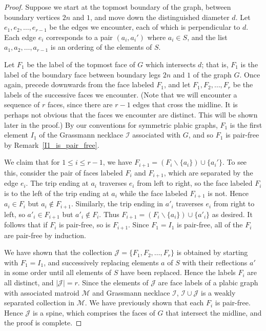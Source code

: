 \documentclass[10pt]{amsart}
\theoremstyle{definition}
\begin{document}
\begin{proof}
Suppose we start at the topmost boundary of the graph, between boundary vertices $2n$ and $1$, and move down the distinguished diameter $d$. Let $e_1, e_2, \ldots, e_{r-1}$ be the edges we encounter, each of which is perpendicular to $d$. Each edge $e_i$ corresponds to a pair $(a_i, a_i')$ where $a_i \in S$, and the list $a_1,a_2,\ldots,a_{r-1}$ is an ordering of the elements of $S$.

Let $F_1$ be the label of the topmost face of $G$ which intersects $d$; that is, $F_1$ is the label of the boundary face between boundary legs $2n$ and $1$ of the graph $G$. Once again, precede downwards from the face labeled $F_1$, and let $F_1, F_2, \ldots, F_r$ be the labels of the successive faces we encounter. (Note that we will encounter a sequence of $r$ faces, since there are $r-1$ edges that cross the midline. It is perhaps not obvious that the faces we encounter are distinct. This will be shown later in the proof.) By our conventions for symmetric plabic graphs, $F_1$ is the first element $I_1$ of the Grassmann necklace $\mathcal{I}$ associated with $G$, and so $F_1$ is pair-free by Remark~\ref{I1_is_pair_free}.

We claim that for $1 \leq i \leq r-1$, we have $F_{i+1} = (F_i \backslash \{a_i\}) \cup \{a_i'\}$. To see this, consider the pair of faces labeled $F_i$ and $F_{i+1}$, which are separated by the edge $e_i$. The trip ending at $a_i$ traverses $e_i$ from left to right, so the face labeled $F_{i}$ is to the left of the trip ending at $a_i$ while the face labeled $F_{i+1}$ is not. Hence $a_i \in F_{i}$ but $a_i \not\in F_{i+1}$. Similarly, the trip ending in $a'_i$ traverses $e_i$ from right to left, so $a'_i \in F_{i+1}$ but $a'_i \not\in F_{i}$. Thus $F_{i+1} = (F_i \backslash \{a_i\}) \cup \{a'_i\}$ as desired. It follows that if $F_i$ is pair-free, so is $F_{i+1}$. Since $F_1 = I_1$ is pair-free, all of the $F_i$ are pair-free by induction.

We have shown that the collection $\mathcal{J} = \{F_1, F_2, \ldots, F_r\}$ is obtained by starting with $F_1 = I_1$, and successively replacing elements $a$ of $S$ with their reflections $a'$ in some order until all elements of $S$ have been replaced. Hence the labels $F_i$ are all distinct, and $|\mathcal{J}| = r$. Since the elements of $\mathcal{J}$ are face labels of a plabic graph with associated matroid $\mathcal{M}$ and Grassmann necklace $\mathcal{I}$, $\mathcal{I} \cup \mathcal{J}$ is a weakly separated collection in $\mathcal{M}$. We have previously shown that each $F_i$ is pair-free. Hence $\mathcal{J}$ is a spine, which comprises the faces of $G$ that intersect the midline, and the proof is complete.\end{proof}
\end{document}
